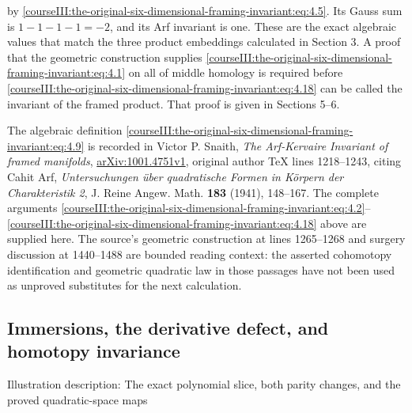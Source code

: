 by \eqref{courseIII:the-original-six-dimensional-framing-invariant:eq:4.5}. Its Gauss sum is \(1-1-1-1=-2\), and its Arf invariant is one. These are the exact algebraic values that match the three product embeddings calculated in Section 3. A proof that the geometric construction supplies \eqref{courseIII:the-original-six-dimensional-framing-invariant:eq:4.1} on all of middle homology is required before \eqref{courseIII:the-original-six-dimensional-framing-invariant:eq:4.18} can be called the invariant of the framed product. That proof is given in Sections 5--6.

The algebraic definition \eqref{courseIII:the-original-six-dimensional-framing-invariant:eq:4.9} is recorded in Victor P. Snaith, \emph{The Arf-Kervaire Invariant of framed manifolds}, \href{https://arxiv.org/abs/1001.4751v1}{arXiv:1001.4751v1}, original author TeX lines 1218--1243, citing Cahit Arf, \emph{Untersuchungen über quadratische Formen in Körpern der Charakteristik 2}, J. Reine Angew. Math. \textbf{183} (1941), 148--167. The complete arguments \eqref{courseIII:the-original-six-dimensional-framing-invariant:eq:4.2}--\eqref{courseIII:the-original-six-dimensional-framing-invariant:eq:4.18} above are supplied here. The source's geometric construction at lines 1265--1268 and surgery discussion at 1440--1488 are bounded reading context: the asserted cohomotopy identification and geometric quadratic law in those passages have not been used as unproved substitutes for the next calculation.

\subsection{Immersions, the derivative defect, and homotopy invariance}
\label{courseIII:the-original-six-dimensional-framing-invariant:framed-six-homotopy-defects}

\label{courseIII:the-original-six-dimensional-framing-invariant:section-5}\label{courseIII:framed6:5}

Illustration description: The exact polynomial slice, both parity changes, and the proved quadratic-space maps

